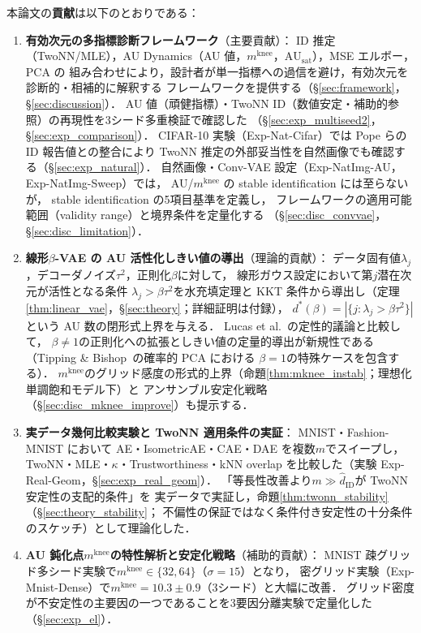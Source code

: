 \documentclass[11pt,a4paper]{jsarticle}
\newcommand{\kap}{\kappa}
\newcommand{\AUsat}{\mathrm{AU}_{\mathrm{sat}}}
\newcommand{\mknee}{m^{\mathrm{knee}}}
\begin{document}
本論文の\textbf{貢献}は以下のとおりである：
\begin{enumerate}
  \item \textbf{有効次元の多指標診断フレームワーク}（主要貢献）：
        ID 推定（TwoNN/MLE），AU Dynamics（AU 値，$\mknee$，$\AUsat$），MSE エルボー，PCA の
        組み合わせにより，設計者が単一指標への過信を避け，有効次元を診断的・相補的に解釈する
        フレームワークを提供する（§\ref{sec:framework}，§\ref{sec:discussion}）．
        AU 値（頑健指標）・TwoNN ID（数値安定・補助的参照）の再現性を3シード多重検証で確認した
        （§\ref{sec:exp_multiseed2}，§\ref{sec:exp_comparison}）．
        CIFAR-10 実験（Exp-Nat-Cifar）では Pope ら\cite{pope2021intrinsic}の ID 報告値との整合により
        TwoNN 推定の外部妥当性を自然画像でも確認する（§\ref{sec:exp_natural}）．
        自然画像・Conv-VAE 設定（Exp-NatImg-AU，Exp-NatImg-Sweep）では，
        AU/$\mknee$ の stable identification には至らないが，
        stable identification の5項目基準を定義し，
        フレームワークの適用可能範囲（validity range）と境界条件を定量化する
        （§\ref{sec:disc_convvae}，§\ref{sec:disc_limitation}）．
  \item \textbf{線形$\beta$-VAE の AU 活性化しきい値の導出}（理論的貢献）：
        データ固有値$\lambda_j$，デコーダノイズ$\tau^2$，正則化$\beta$に対して，
        線形ガウス設定において第$j$潜在次元が活性となる条件
        $\lambda_j > \beta\tau^2$を水充填定理と KKT 条件から導出し（定理\ref{thm:linear_vae}，§\ref{sec:theory}；詳細証明は付録），
        $d^*(\beta) = |\{j:\lambda_j > \beta\tau^2\}|$という AU 数の閉形式上界を与える．
        Lucas et al.~\cite{lucas2019elbo}の定性的議論と比較して，
        $\beta \neq 1$の正則化への拡張としきい値の定量的導出が新規性である
        （Tipping \& Bishop~\cite{tippingbishop1999ppca}の確率的 PCA における
        $\beta=1$の特殊ケースを包含する）．
        $\mknee$のグリッド感度の形式的上界（命題\ref{thm:mknee_instab}；理想化単調飽和モデル下）と
        アンサンブル安定化戦略（§\ref{sec:disc_mknee_improve}）も提示する．
  \item \textbf{実データ幾何比較実験と TwoNN 適用条件の実証}：
        MNIST・Fashion-MNIST において AE・IsometricAE・CAE・DAE を複数$m$でスイープし，
        TwoNN・MLE・$\kap$・Trustworthiness・kNN overlap を比較した（実験 Exp-Real-Geom，§\ref{sec:exp_real_geom}）．
        「等長性改善より$m \gg \hat{d}_\mathrm{ID}$が TwoNN 安定性の支配的条件」を
        実データで実証し，命題\ref{thm:twonn_stability}（§\ref{sec:theory_stability}；
        不偏性の保証ではなく条件付き安定性の十分条件のスケッチ）として理論化した．
  \item \textbf{AU 鈍化点$\mknee$の特性解析と安定化戦略}（補助的貢献）：
        MNIST 疎グリッド多シード実験で$\mknee \in \{32,64\}$（$\sigma=15$）となり，
        密グリッド実験（Exp-Mnist-Dense）で$\mknee = 10.3 \pm 0.9$（3シード）と大幅に改善．
        グリッド密度が不安定性の主要因の一つであることを3要因分離実験で定量化した（§\ref{sec:exp_el}）．
\end{enumerate}
\end{document}
